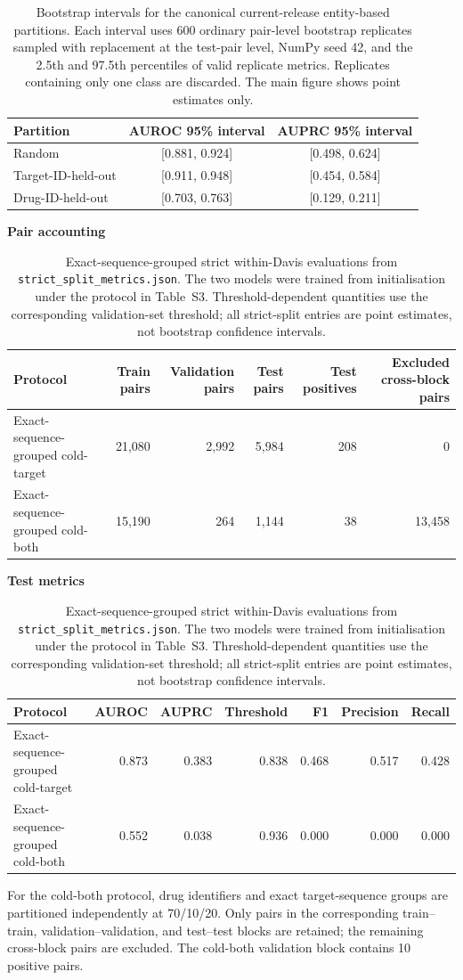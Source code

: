 \documentclass[11pt]{article}
\begin{document}
\begin{table}[H]
\centering
\caption{Bootstrap intervals for the canonical current-release entity-based partitions.
Each interval uses 600 ordinary pair-level bootstrap replicates sampled with
replacement at the test-pair level, NumPy seed 42, and the 2.5th and 97.5th
percentiles of valid replicate metrics. Replicates containing only one class
are discarded. The main figure shows point estimates only.}
\begin{tabular}{lcc}
\toprule
Partition & AUROC 95\% interval & AUPRC 95\% interval \\
\midrule
Random & [0.881, 0.924] & [0.498, 0.624] \\
Target-ID-held-out & [0.911, 0.948] & [0.454, 0.584] \\
Drug-ID-held-out & [0.703, 0.763] & [0.129, 0.211] \\
\bottomrule
\end{tabular}
\end{table}

\begin{table}[H]
\centering
\caption{Exact-sequence-grouped strict within-Davis evaluations from
\texttt{strict\_split\_metrics.json}. The two models were trained from
initialisation under the protocol in Table~S3. Threshold-dependent quantities use
the corresponding validation-set threshold; all strict-split entries are point
estimates, not bootstrap confidence intervals.}
\scriptsize
\textbf{Pair accounting}\par\smallskip
\begin{tabular}{lrrrrr}
\toprule
Protocol & Train pairs & Validation pairs & Test pairs & Test positives & Excluded cross-block pairs \\
\midrule
Exact-sequence-grouped cold-target & 21,080 & 2,992 & 5,984 & 208 & 0 \\
Exact-sequence-grouped cold-both & 15,190 & 264 & 1,144 & 38 & 13,458 \\
\bottomrule
\end{tabular}

\medskip
\textbf{Test metrics}\par\smallskip
\begin{tabular}{lrrrrrr}
\toprule
Protocol & AUROC & AUPRC & Threshold & F1 & Precision & Recall \\
\midrule
Exact-sequence-grouped cold-target & 0.873 & 0.383 & 0.838 & 0.468 & 0.517 & 0.428 \\
Exact-sequence-grouped cold-both & 0.552 & 0.038 & 0.936 & 0.000 & 0.000 & 0.000 \\
\bottomrule
\end{tabular}

\medskip
\raggedright For the cold-both protocol, drug identifiers and exact
target-sequence groups are partitioned independently at 70/10/20. Only pairs in
the corresponding train--train, validation--validation, and test--test blocks
are retained; the remaining cross-block pairs are excluded. The cold-both
validation block contains 10 positive pairs.
\end{table}
\end{document}
